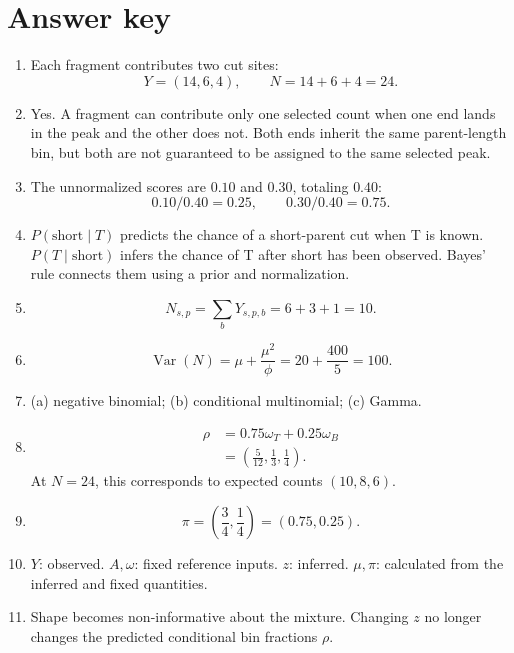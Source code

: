 \documentclass[11pt]{article}
\newcommand{\Var}{\operatorname{Var}}
\begin{document}
\newpage
\section{Answer key}

\begin{enumerate}[leftmargin=2.2em,label=\textbf{\arabic*.}]
  \item Each fragment contributes two cut sites:
  \[
  Y=(14,6,4),\qquad N=14+6+4=24.
  \]

  \item Yes. A fragment can contribute only one selected count when one end lands
  in the peak and the other does not. Both ends inherit the same parent-length
  bin, but both are not guaranteed to be assigned to the same selected peak.

  \item The unnormalized scores are \(0.10\) and \(0.30\), totaling \(0.40\):
  \[
  0.10/0.40=0.25,\qquad0.30/0.40=0.75.
  \]

  \item \(P(\text{short}\mid T)\) predicts the chance of a short-parent cut when
  T is known. \(P(T\mid\text{short})\) infers the chance of T after short has been
  observed. Bayes' rule connects them using a prior and normalization.

  \item
  \[
  N_{s,p}=\sum_bY_{s,p,b}=6+3+1=10.
  \]

  \item
  \[
  \Var(N)=\mu+\frac{\mu^2}{\phi}
  =20+\frac{400}{5}=100.
  \]

  \item (a) negative binomial; (b) conditional multinomial; (c) Gamma.

  \item
  \[
  \begin{aligned}
  \rho
  &=0.75\omega_T+0.25\omega_B\\
  &=\left(\frac{5}{12},\frac13,\frac14\right).
  \end{aligned}
  \]
  At \(N=24\), this corresponds to expected counts \((10,8,6)\).

  \item
  \[
  \pi=\left(\frac{3}{4},\frac{1}{4}\right)=(0.75,0.25).
  \]

  \item \(Y\): observed. \(A,\omega\): fixed reference inputs. \(z\): inferred.
  \(\mu,\pi\): calculated from the inferred and fixed quantities.

  \item Shape becomes non-informative about the mixture. Changing \(z\) no longer
  changes the predicted conditional bin fractions \(\rho\).


\end{enumerate}
\end{document}
